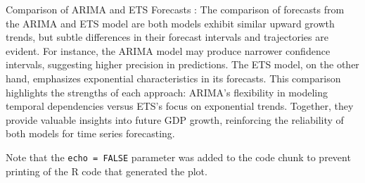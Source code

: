 \documentclass[
]{article}
\begin{document}
Comparison of ARIMA and ETS Forecasts : The comparison of forecasts from
the ARIMA and ETS model are both models exhibit similar upward growth
trends, but subtle differences in their forecast intervals and
trajectories are evident. For instance, the ARIMA model may produce
narrower confidence intervals, suggesting higher precision in
predictions. The ETS model, on the other hand, emphasizes exponential
characteristics in its forecasts. This comparison highlights the
strengths of each approach: ARIMA's flexibility in modeling temporal
dependencies versus ETS's focus on exponential trends. Together, they
provide valuable insights into future GDP growth, reinforcing the
reliability of both models for time series forecasting.

Note that the \texttt{echo\ =\ FALSE} parameter was added to the code
chunk to prevent printing of the R code that generated the plot.
\end{document}
